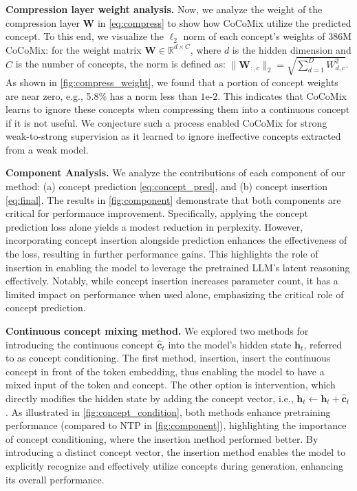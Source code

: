 \documentclass[]{fairmeta}
\def\rvc{{\mathbf{c}}}
\def\rvh{{\mathbf{h}}}
\def\rmW{{\mathbf{W}}}
\newcommand{\sname}{CoCoMix\xspace}
\begin{document}
\textbf{Compression layer weight analysis.} Now, we analyze the weight of the compression layer $\rmW$ in \autoref{eq:compress} to show how \sname utilize the predicted concept. To this end, we visualize the $\ell_2$ norm of each concept's weights of 386M \sname: for the weight matrix $\rmW \in \mathbb{R}^{d \times C}$, where $d$ is the hidden dimension and $C$ is the number of concepts, the norm is defined as: $\lVert\rmW_{:,c}\rVert_2 = \sqrt{\sum_{d=1}^D W_{d,c}^2}$. As shown in \autoref{fig:compress_weight}, we found that a portion of concept weights are near zero, e.g., 5.8\% has a norm less than $1\text{e-}2$. This indicates that \sname learns to ignore these concepts when compressing them into a continuous concept if it is not useful. We conjecture such a process enabled \sname for strong weak-to-strong supervision as it learned to ignore ineffective concepts extracted from a weak model.

\textbf{Component Analysis.} We analyze the contributions of each component of our method: (a) concept prediction \autoref{eq:concept_pred}, and (b) concept insertion \autoref{eq:final}. The results in \autoref{fig:component} demonstrate that both components are critical for performance improvement. Specifically, applying the concept prediction loss alone yields a modest reduction in perplexity. However, incorporating concept insertion alongside prediction enhances the effectiveness of the loss, resulting in further performance gains. This highlights the role of insertion in enabling the model to leverage the pretrained LLM's latent reasoning effectively. Notably, while concept insertion increases parameter count, it has a limited impact on performance when used alone, emphasizing the critical role of concept prediction.

\textbf{Continuous concept mixing method.}
We explored two methods for introducing the continuous concept $\hat{\rvc}_t$ into the model’s hidden state $\rvh_t$, referred to as concept conditioning. The first method, {insertion}, insert the continuous concept in front of the token embedding, thus enabling the model to have a mixed input of the token and concept. The other option is {intervention}, which directly modifies the hidden state by adding the concept vector, i.e., $\rvh_t \leftarrow \rvh_t + \hat{\rvc}_t$. As illustrated in \autoref{fig:concept_condition}, both methods enhance pretraining performance (compared to NTP in \autoref{fig:component}), highlighting the importance of concept conditioning, where the insertion method performed better. By introducing a distinct concept vector, the insertion method enables the model to explicitly recognize and effectively utilize concepts during generation, enhancing its overall performance.
\end{document}

